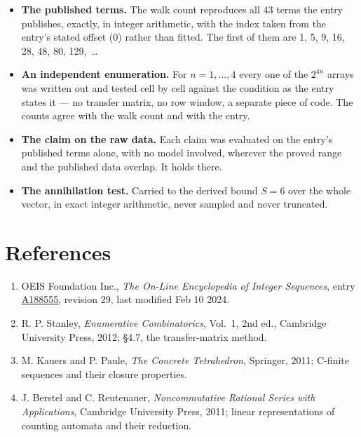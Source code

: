 \documentclass[11pt]{article}
\theoremstyle{definition}
\begin{document}
\begin{itemize}

\item {\bfseries The published terms.} The walk count reproduces all 43 terms the entry publishes, exactly, in integer arithmetic, with the index taken from the entry's stated offset (0) rather than fitted. The first of them are 1, 5, 9, 16, 28, 48, 80, 129,~\dots

\item {\bfseries An independent enumeration.} For $n = 1,\dots,4$ every one of the $2^{4n}$ arrays was written out and tested cell by cell against the condition as the entry states it --- no transfer matrix, no row window, a separate piece of code. The counts agree with the walk count and with the entry.

\item {\bfseries The claim on the raw data.} Each claim was evaluated on the entry's published terms alone, with no model involved, wherever the proved range and the published data overlap. It holds there.

\item {\bfseries The annihilation test.} Carried to the derived bound $S = 6$ over the whole vector, in exact integer arithmetic, never sampled and never truncated.

\end{itemize}

\section{References}

\begin{enumerate}

\item OEIS Foundation Inc., \emph{The On-Line Encyclopedia of Integer Sequences}, entry \href{https://oeis.org/A188555}{A188555}, revision 29, last modified Feb 10 2024.

\item R. P. Stanley, \emph{Enumerative Combinatorics}, Vol.~1, 2nd ed., Cambridge University Press, 2012; \S4.7, the transfer-matrix method.

\item M. Kauers and P. Paule, \emph{The Concrete Tetrahedron}, Springer, 2011; C-finite sequences and their closure properties.

\item J. Berstel and C. Reutenauer, \emph{Noncommutative Rational Series with Applications}, Cambridge University Press, 2011; linear representations of counting automata and their reduction.

\end{enumerate}
\end{document}

